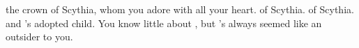 \documentclass[char]{Kos}
\begin{document}
\begin{contacts}
\contact{\cBride{}} the crown \cBride{\prince} of Scythia, whom you adore with all your heart.
\contact{\cScythiaKing{}} \cScythiaKing{\Monarch} of Scythia.
\contact{\cScythiaQueen{}} \cScythiaQueen{\Monarch} of Scythia.
\contact{\cWard{}} \cScythiaKing{} and \cScythiaQueen{}'s adopted child. You know little about \cWard{\them}, but \cWard{\they}'s always seemed like an outsider to you.
\end{contacts} 
\end{document}
